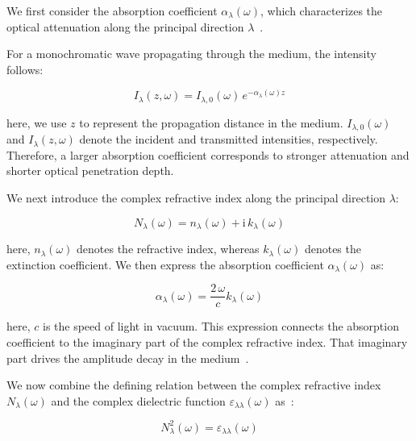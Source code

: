 We first consider the absorption coefficient $\alpha_{\lambda}(\omega)$,
which characterizes the optical attenuation along the principal direction $\lambda$~\cite{lin2023recent}.

For a monochromatic wave propagating through the medium,
the intensity follows:

\begin{equation}
    I_{\lambda}(z,\omega)= I_{\lambda,0}(\omega)\,e^{-\alpha_{\lambda}(\omega) z}
\label{intensity_attenuation_from_absorption_coefficient}
\end{equation}

here, we use $z$ to represent the propagation distance in the medium.
$I_{\lambda,0}(\omega)$ and $I_{\lambda}(z,\omega)$
denote the incident and transmitted intensities,
respectively.
Therefore, a larger absorption coefficient corresponds to
stronger attenuation and shorter optical penetration depth.

We next introduce the complex refractive index along the
principal direction $\lambda$:

\begin{equation}
    N_{\lambda}(\omega) = n_{\lambda}(\omega) +\mathrm{i}\, k_{\lambda}(\omega)
\label{complex_refractive_index_for_absorption_coefficient}
\end{equation}

here, $n_{\lambda}(\omega)$ denotes the refractive index,
whereas $k_{\lambda}(\omega)$ denotes the extinction coefficient.
We then express the absorption coefficient $\alpha_{\lambda}(\omega)$ as:

\begin{equation}
    \alpha_{\lambda}(\omega)
    = \frac{2\,\omega}{c}k_{\lambda}(\omega)
\label{absorption_coefficient_from_extinction_coefficient}
\end{equation}

here, $c$ is the speed of light in vacuum.
This expression connects the absorption coefficient to the imaginary part of the complex refractive index.
That imaginary part drives the amplitude decay in the medium~\cite{wooten2013optical, dressel2002electrodynamics,fox2010optical,gajdovs2006linear}.

We now combine the defining relation between the complex
refractive index $N_{\lambda}(\omega)$
and the complex dielectric function $\varepsilon_{\lambda\lambda}(\omega)$ as~\cite{born2013principles}:

\begin{equation}
    N_{\lambda}^{2}(\omega)= \varepsilon_{\lambda\lambda}(\omega)
\label{refractive_index_dielectric_relation}
\end{equation}

